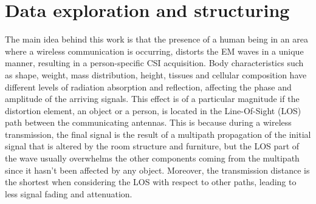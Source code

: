 \documentclass[binding=0.7cm, oneside]{sapthesis}
\begin{document}
\section{Data exploration and structuring}
The main idea behind this work is that the presence of a human being in an area where a wireless communication is occurring,
distorts the EM waves in a unique manner, resulting in a person-specific CSI acquisition. Body characteristics such as shape, weight, mass distribution,
height, tissues and cellular composition have different levels of radiation absorption and reflection, affecting the phase and amplitude of the arriving signals.
This effect is of a particular magnitude if the distortion element, an object or a person, is located in the Line-Of-Sight (LOS) path between the communicating antennas.
This is because during a wireless transmission, the final signal is the result of a multipath propagation of the initial signal that is altered by the room structure and furniture,
but the LOS part of the wave usually overwhelms the other components coming from the multipath since it hasn't been affected by any object. Moreover, the transmission distance is the shortest
when considering the LOS with respect to other paths, leading to less signal fading and attenuation.
\end{document}
